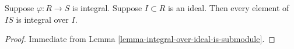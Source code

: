 \begin{lemma}
\label{lemma-integral-integral-over-ideal}
Suppose $\varphi : R \to S$ is integral.
Suppose $I \subset R$ is an ideal.
Then every element of $IS$ is integral over $I$.
\end{lemma}

\begin{proof}
Immediate from Lemma \ref{lemma-integral-over-ideal-is-submodule}.
\end{proof}